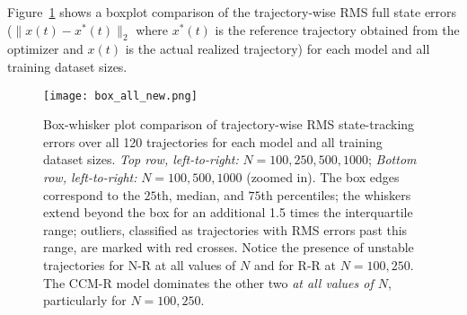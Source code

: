 \documentclass[conference]{svproc}
\begin{document}
Figure~\ref{fig:box_all} shows a boxplot comparison of the trajectory-wise RMS full state errors ($\|x(t)-x^*(t)\|_2$ where $x^*(t)$ is the reference trajectory obtained from the optimizer and $x(t)$ is the actual realized trajectory) for each model and all training dataset sizes. 
\begin{figure}[h]
    \centering
    \texttt{[image: box\_all\_new.png]}
    \caption{Box-whisker plot comparison of trajectory-wise RMS state-tracking errors over all 120 trajectories for each model and all training dataset sizes. \emph{Top row, left-to-right:} $N=100, 250, 500, 1000$; \emph{Bottom row, left-to-right:} $N=100, 500, 1000$ (zoomed in). The box edges correspond to the $25$th, median, and $75$th percentiles; the whiskers extend beyond the box for an additional 1.5 times the interquartile range; outliers, classified as trajectories with RMS errors past this range, are marked with red crosses. Notice the presence of unstable trajectories for N-R at all values of $N$ and for R-R at $N=100, 250$. The CCM-R model dominates the other two \emph{at all values of $N$}, particularly for $N = 100, 250$. }
        \label{fig:box_all}
\end{figure}
\end{document}
